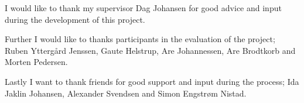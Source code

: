I would like to thank my supervisor Dag Johansen for good advice and input during the development of this project. 

Further I would like to thanks participants in the evaluation of the project; Ruben Ytterg{\aa}rd Jenssen, Gaute Helstrup, Are Johannessen, Are Brodtkorb  and Morten Pedersen.

Lastly I want to thank friends for good support and input during the process; Ida Jaklin Johansen, Alexander Svendsen and Simon Engstr{\o}m Nistad.